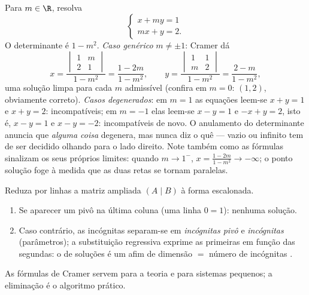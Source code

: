 \begin{example}
\label{ex:b1:det:cramerparameter}
Para $m \in \R$, resolva
\[
\begin{cases}
x + m y = 1\\
m x + y = 2 .
\end{cases}
\]
O determinante é $1 - m^2$. \emph{Caso genérico} $m \neq \pm1$: Cramer dá
\[
x = \frac{\begin{vmatrix} 1 & m\\ 2 & 1\end{vmatrix}}{1 - m^2}
= \frac{1 - 2m}{1 - m^2},
\qquad
y = \frac{\begin{vmatrix} 1 & 1\\ m & 2\end{vmatrix}}{1 - m^2}
= \frac{2 - m}{1 - m^2},
\]
uma solução limpa para cada $m$ admissível (confira em $m = 0$:
$(1, 2)$, obviamente correto). \emph{Casos degenerados}: em $m = 1$
as equações leem-se $x + y = 1$ e $x + y = 2$: incompatíveis; em $m = -1$ elas
leem-se $x - y = 1$ e $-x + y = 2$, isto é, $x - y =
1$ e $x - y = -2$: incompatíveis de novo.
O anulamento do determinante anuncia que \emph{alguma coisa}
degenera, mas nunca diz o quê --- vazio ou infinito tem de ser
decidido olhando para o lado direito. Note também como as fórmulas
sinalizam os seus próprios limites: quando $m \to 1^{-}$, $x = \frac{1 - 2m}{1 - m^2} \to
-\infty$; o ponto
solução foge à medida que as duas retas se tornam paralelas.
\end{example}

\begin{method}\label{met:b1:det:gauss}
Reduza por linhas a matriz ampliada $(A \mid B)$ à forma
escalonada.
\begin{enumerate}
  \item Se aparecer um pivô na última coluna (uma linha $0 = 1$):
        nenhuma solução.
  \item Caso contrário, as incógnitas separam-se em \emph{incógnitas
        pivô} e \emph{incógnitas } (parâmetros); a
        substituição regressiva exprime as primeiras em função das
        segundas: o  de soluções é um  afim de
        dimensão $=$ número de incógnitas .
\end{enumerate}
As fórmulas de Cramer servem para a teoria e para sistemas pequenos;
a eliminação é o algoritmo prático.
\end{method}


